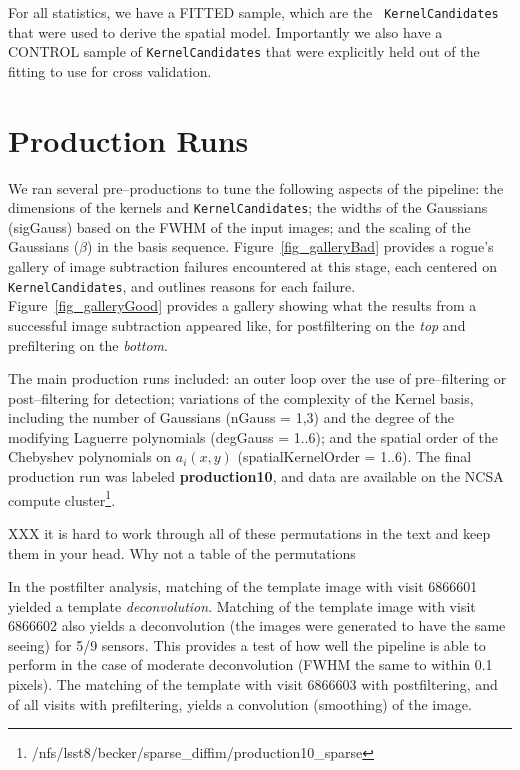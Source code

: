 \documentclass[prd, nofootinbib, floatfix, 11pt,tightenlines,times]{article}
\begin{document}
For all statistics, we have a FITTED sample, which are the {\tt
  KernelCandidates} that were used to derive the spatial model.
Importantly we also have a CONTROL sample of {\tt KernelCandidates}
that were explicitly held out of the fitting to use for cross
validation.

\section{Production Runs}

We ran several pre--productions to tune the following aspects of the
pipeline: the dimensions of the kernels and {\tt KernelCandidates};
the widths of the Gaussians (sigGauss) based on the FWHM of the input
images; and the scaling of the Gaussians ($\beta$) in the basis
sequence.  Figure~\ref{fig_galleryBad} provides a rogue's gallery of
image subtraction failures encountered at this stage, each centered on
{\tt KernelCandidates}, and outlines reasons for each failure.
Figure~\ref{fig_galleryGood} provides a gallery showing what the
results from a successful image subtraction appeared like, for
postfiltering on the {\it top} and prefiltering on the {\it bottom}.

The main production runs included: an outer loop over the use of
pre--filtering or post--filtering for detection; variations of the
complexity of the Kernel basis, including the number of Gaussians
(nGauss = 1,3) and the degree of the modifying Laguerre polynomials
(degGauss = 1..6); and the spatial order of the Chebyshev polynomials
on $a_i(x,y)$ (spatialKernelOrder = 1..6).  The final production run
was labeled {\bf production10}, and data are available on the NCSA compute
cluster\footnote{/nfs/lsst8/becker/sparse\_diffim/production10\_sparse}.

{XXX it is hard to work through all of these permutations in the text
  and keep them in your head. Why not a table of the permutations}

In the postfilter analysis, matching of the template image
with visit 6866601 yielded a template {\it deconvolution}.  Matching of the template 
image with visit 6866602 also yields a deconvolution (the images were generated to
have the same seeing) for 5/9 sensors.  This provides a test
of how well the pipeline is able to perform in the case of moderate deconvolution 
(FWHM the same to within 0.1 pixels).  The matching of the template
with visit 6866603 with postfiltering, and of all visits with
prefiltering, yields a convolution (smoothing) of the image. 
\end{document}
